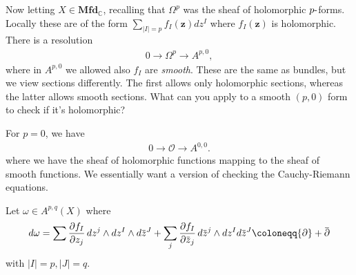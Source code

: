 \begin{remark}

Now letting \(X \in {\mathbf{Mfd}}_{\mathbb{C}}\), recalling that
\(\Omega^p\) was the sheaf of holomorphic \(p {\hbox{-}}\)forms. Locally
these are of the form
\(\sum_{{\left\lvert {I} \right\rvert} = p} f_I(\mathbf{z}) dz^I\) where
\(f_I(\mathbf{z})\) is holomorphic. There is a resolution
\begin{align*}
0 \xrightarrow{} \Omega^p \xrightarrow{} A^{p, 0}
,\end{align*}
where in \(A^{p, 0}\) we allowed also \(f_I\) are \emph{smooth}. These
are the same as bundles, but we view sections differently. The first
allows only holomorphic sections, whereas the latter allows smooth
sections. What can you apply to a smooth \((p, 0)\) form to check if
it's holomorphic?

\end{remark}

\begin{example}[?]

For \(p=0\), we have
\begin{align*}
0 \to {\mathcal{O}}\to A^{0, 0}
.\end{align*}
where we have the sheaf of holomorphic functions mapping to the sheaf of
smooth functions. We essentially want a version of checking the
Cauchy-Riemann equations.

\end{example}

\begin{definition}[?]

Let \(\omega\in A^{p, q}(X)\) where
\begin{align*}
d \omega = \sum {\frac{\partial f_I}{\partial z_j}\,} dz^j \wedge dz^I \wedge d\mkern 1.5mu\overline{\mkern-1.5muz\mkern-1.5mu}\mkern 1.5mu^J + \sum_j {\frac{\partial f_I}{\partial \mkern 1.5mu\overline{\mkern-1.5muz\mkern-1.5mu}\mkern 1.5mu_j}\,} d\mkern 1.5mu\overline{\mkern-1.5muz\mkern-1.5mu}\mkern 1.5mu^j \wedge dz^I d\mkern 1.5mu\overline{\mkern-1.5muz\mkern-1.5mu}\mkern 1.5mu^J\coloneqq{\partial}+ \mkern 1.5mu\overline{\mkern-1.5mu{\partial}\mkern-1.5mu}\mkern 1.5mu 
\end{align*}
with
\({\left\lvert {I} \right\rvert} = p, {\left\lvert {J} \right\rvert} = q\).

\end{definition}

